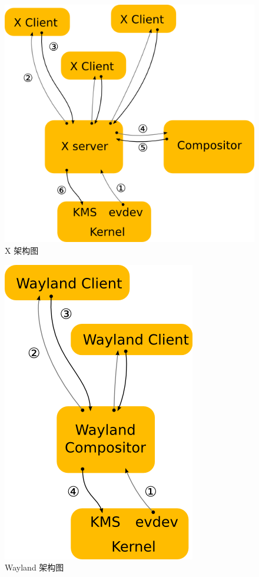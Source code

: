 \documentclass[doctor,openright,twoside]{sjtuthesis}
\theoremstyle{plain}
\theoremstyle{definition}
\theoremstyle{remark}
\theoremstyle{ocrenumbox}
\theoremstyle{plain}
\begin{document}
\begin{figure}
\includegraphics{X-architecture} \caption[X 架构图]{X 架构图}\label{fig:xw-x}
\end{figure}

\begin{figure}
\includegraphics{Wayland-architecture} \caption[Wayland 架构图]{Wayland 架构图}\label{fig:xw-w}
\end{figure}
\end{document}
